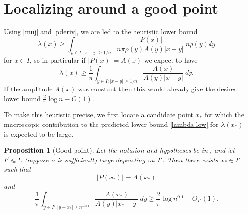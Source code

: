 \documentclass[12pt]{amsart}
\newtheorem{proposition}[theorem]{Proposition}
\begin{document}
\section{Localizing around a good point}

Using \eqref{muj} and \eqref{pderiv}, we are led to the heuristic lower bound
$$ \lambda(x) \geq \int_{y \in I: |x-y| \geq 1/n} \frac{|P(x)|}{n \pi \rho(y) A(y) |x-y|}\ n \rho(y) dy$$
for $x \in I$, so in particular if $|P(x)|=A(x)$ we expect to have
\begin{equation}\label{lambda-low}
    \lambda(x) \geq \frac{1}{\pi} \int_{y \in I: |x-y| \geq 1/n} \frac{A(x)}{A(y) |x-y|}\ dy.
\end{equation}
If the amplitude $A(x)$ was constant then this would already give the desired lower bound $\frac{2}{\pi} \log n - O(1)$.

To make this heuristic precise, we first locate a candidate point $x_*$ for which the macroscopic contribution to the predicted lower bound \eqref{lambda-low} for $\lambda(x_*)$ is expected to be large.

\begin{proposition}[Good point]\label{gp}  Let the notation and hypotheses be in , and let $I' \Subset I$.  Suppose $n$ is sufficiently large depending on $I'$. Then there exists $x_* \in I'$ such that
\begin{equation}\label{pxs}
|P(x_*)| = A(x_*)
\end{equation}
and
\begin{equation}\label{good-est}
    \frac{1}{\pi} \int_{y \in I': |y-x_*| \geq n^{-0.1}} \frac{A(x_*)}{A(y) |x_*-y|}\ dy \geq \frac{2}{\pi} \log n^{0.1} - O_{I'}(1).
\end{equation}
\end{proposition}
\end{document}
